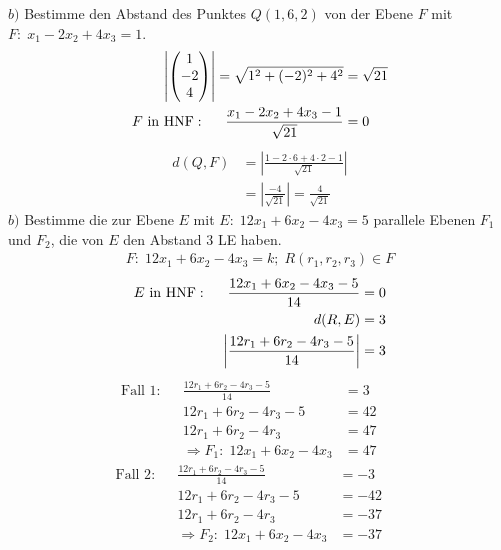 \documentclass{article}
\begin{document}
\begin{boxx}[DarkBlue]{}
    $b)$\hspace{3mm} Bestimme den Abstand des Punktes $Q(1,6,2)$ von der Ebene $F$ mit $\displaystyle F:\;x_1 - 2x_2 + 4x_3 = 1$.
    \begin{align*}
        \left|\begin{pmatrix}1\\-2\\4\end{pmatrix}\right| = \sqrt{1^2 + (-2)^2 + 4^2} &= \sqrt{21} \\
        F \text{ in HNF}: \hspace*{5mm} \frac{x_1 - 2x_2 + 4x_3-1}{\sqrt{21}} &= 0
    \end{align*}
    \begin{align*}
        d(Q,F) &= \left|\frac{1- 2\cdot 6 + 4\cdot 2 - 1}{\sqrt{21}}\right|\\
        &=\left|\frac{-4}{\sqrt{21}}\right| = \frac{4}{\sqrt{21}}
    \end{align*}
    $b)$\hspace{3mm} Bestimme die zur Ebene $E$ mit $\displaystyle E:\; 12x_1 + 6x_2 - 4x_3 = 5$ parallele Ebenen $F_1$ und $F_2$, die von $E$ 
    \hspace*{6mm} den Abstand $3$ LE haben.
    \begin{align*}
        F:\; 12x_1 + 6x_2 - 4x_3 = k;\;R(r_1,r_2,r_3) \in F
    \end{align*}
    \begin{align*}
        E \text{ in HNF}: \hspace*{5mm} \frac{12x_1+6x_2-4x_3-5}{14} &= 0\\
        d(R,E) &= 3 \\
        \left|\frac{12r_1+6r_2-4r_3-5}{14}\right| &= 3 \\
    \end{align*}
    \begin{align*}
        \text{Fall 1}:&&\frac{12r_1+6r_2-4r_3-5}{14} &= 3&&\\
        &&12r_1+6r_2-4r_3-5 &= 42 \\
        &&12r_1+6r_2-4r_3 &= 47 \\
        &&\Rightarrow F_1:\; 12x_1+6x_2-4x_3 &= 47
    \end{align*}
    \begin{align*}
        \text{Fall 2}:&&\frac{12r_1+6r_2-4r_3-5}{14} &= -3 &&\\
        &&12r_1+6r_2-4r_3-5 &= -42 \\
        &&12r_1+6r_2-4r_3 &= -37 \\
        &&\Rightarrow F_2:\; 12x_1+6x_2-4x_3 &= -37
    \end{align*}
\end{boxx}
\newpage
\end{document}
